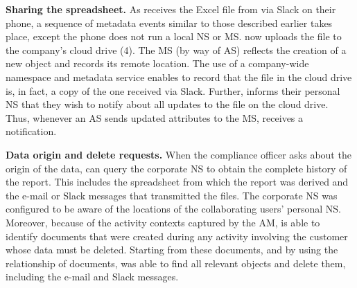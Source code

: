 
\noindent\textbf{Sharing the spreadsheet.}
As \persc  receives the Excel file from \persa via Slack on their phone, a sequence of metadata events similar to those described earlier takes place, except the phone does not run a local NS or MS. \persc now uploads the file to the company's cloud drive (4). The MS (by way of AS) reflects the creation of a new object and records its remote location. The use of a company-wide namespace and metadata service enables \system to record that the file in the cloud drive is, in fact, a copy of the one received via Slack.  Further, \persc informs their personal NS that they wish to notify \persa about all updates to the file on the cloud drive. Thus, whenever an AS sends updated attributes to the MS, \persc receives a notification. 

\noindent\textbf{Data origin and delete requests.}
When the compliance officer asks about the origin of the data, \persc can query the corporate NS to obtain the complete history of the report. This includes the spreadsheet from which the report was derived and the e-mail or Slack messages that transmitted the files. 
The corporate NS was configured to be aware of the locations of the collaborating users' personal NS. Moreover, because of the activity contexts captured by the AM, \system is able to identify documents that were created during any activity involving the customer whose data must be deleted. Starting from these documents, and by using the relationship of documents, \persb was able to find all relevant objects and delete them, including the e-mail and Slack messages.


